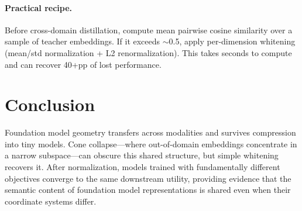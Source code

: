 \documentclass{article}
\begin{document}
\paragraph{Practical recipe.}
Before cross-domain distillation, compute mean pairwise cosine similarity over a sample of teacher embeddings.
If it exceeds $\sim$0.5, apply per-dimension whitening (mean/std normalization + L2 renormalization).
This takes seconds to compute and can recover 40+pp of lost performance.

\section{Conclusion}
\label{sec:conclusion}

Foundation model geometry transfers across modalities and survives compression into tiny models.
Cone collapse---where out-of-domain embeddings concentrate in a narrow subspace---can obscure this shared structure, but simple whitening recovers it.
After normalization, models trained with fundamentally different objectives converge to the same downstream utility, providing evidence that the semantic content of foundation model representations is shared even when their coordinate systems differ.



\end{document}
